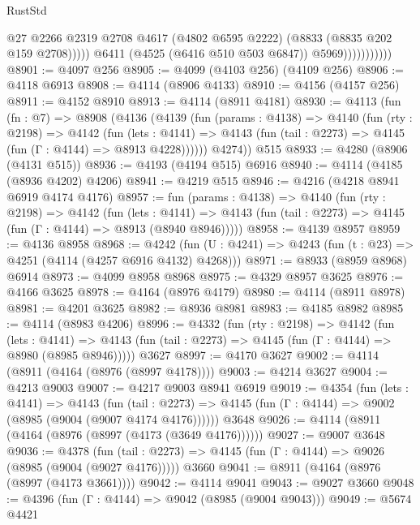 \begin{lexlean}{RustStd}
\begin{coremodule}
{\begin{coremodule}
{{{{{{{{{{{{{{                                @27
                                @2266
                                @2319
                                @2708
                                @4617
                                (@4802 @6595 @2222)
                                (@8833 (@8835 @202 @159 @2708)))))
                          @6411
                          (@4525 (@6416 @510 @503 @6847))
                          @5969)))))))))))
@8901 := @4097 @256
@8905 := @4099 (@4103 @256) (@4109 @256)
@8906 := @4118 @6913
@8908 := @4114 (@8906 @4133)
@8910 := @4156 (@4157 @256)
@8911 := @4152 @8910
@8913 := @4114 (@8911 @4181)
@8930 := @4113
    (fun (fn : @7) =>
    @8908
      (@4136
        (@4139
          (fun (params : @4138) =>
          @4140
            (fun (rty : @2198) =>
            @4142
              (fun (lets : @4141) =>
              @4143 (fun (tail : @2273) => @4145 (fun (Γ : @4144) => @8913 @4228))))))
        @4274))
    @515
@8933 := @4280 (@8906 (@4131 @515))
@8936 := @4193 (@4194 @515) @6916
@8940 := @4114 (@4185 (@8936 @4202) @4206)
@8941 := @4219 @515
@8946 := @4216 (@4218 @8941 @6919 @4174 @4176)
@8957 := fun (params : @4138) =>
  @4140
    (fun (rty : @2198) =>
    @4142
      (fun (lets : @4141) =>
      @4143 (fun (tail : @2273) => @4145 (fun (Γ : @4144) => @8913 (@8940 @8946)))))
@8958 := @4139 @8957
@8959 := @4136 @8958
@8968 := @4242 (fun (U : @4241) => @4243 (fun (t : @23) => @4251 (@4114 (@4257 @6916 @4132) @4268)))
@8971 := @8933 (@8959 @8968) @6914
@8973 := @4099 @8958 @8968
@8975 := @4329 @8957 @3625
@8976 := @4166 @3625
@8978 := @4164 (@8976 @4179)
@8980 := @4114 (@8911 @8978)
@8981 := @4201 @3625
@8982 := @8936 @8981
@8983 := @4185 @8982
@8985 := @4114 (@8983 @4206)
@8996 := @4332
    (fun (rty : @2198) =>
    @4142
      (fun (lets : @4141) =>
      @4143 (fun (tail : @2273) => @4145 (fun (Γ : @4144) => @8980 (@8985 @8946)))))
    @3627
@8997 := @4170 @3627
@9002 := @4114 (@8911 (@4164 (@8976 (@8997 @4178))))
@9003 := @4214 @3627
@9004 := @4213 @9003
@9007 := @4217 @9003 @8941 @6919
@9019 := @4354
    (fun (lets : @4141) =>
    @4143
      (fun (tail : @2273) => @4145 (fun (Γ : @4144) => @9002 (@8985 (@9004 (@9007 @4174 @4176))))))
    @3648
@9026 := @4114 (@8911 (@4164 (@8976 (@8997 (@4173 (@3649 @4176))))))
@9027 := @9007 @3648
@9036 := @4378
    (fun (tail : @2273) => @4145 (fun (Γ : @4144) => @9026 (@8985 (@9004 (@9027 @4176)))))
    @3660
@9041 := @8911 (@4164 (@8976 (@8997 (@4173 @3661))))
@9042 := @4114 @9041
@9043 := @9027 @3660
@9048 := @4396 (fun (Γ : @4144) => @9042 (@8985 (@9004 @9043)))
@9049 := @5674 @4421
}}}}}}}}}}}}}}
\end{coremodule}}
\end{coremodule}
\end{lexlean}
